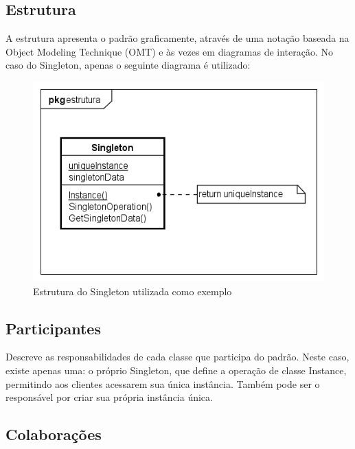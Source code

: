 \subsection*{Estrutura}

A estrutura apresenta o padrão graficamente, através de uma 
notação baseada na Object Modeling Technique (OMT) e às vezes 
em diagramas de interação. No caso do Singleton, apenas o 
seguinte diagrama é utilizado:

\begin{figure}[htb]
	\caption{\label{fig_grafico}Estrutura do Singleton utilizada como exemplo}
	\begin{center}
	    \includegraphics[scale=0.6]{5_padroes-contexto-funcional/5.1_criacionais/5.1.5_singleton/singleton_estrutura.png}
    \end{center}
\end{figure}

\subsection*{Participantes}

Descreve as responsabilidades de cada classe que 
participa do padrão. Neste caso, existe 
apenas uma: o próprio Singleton, que define 
a operação de classe Instance, permitindo aos clientes 
acessarem sua única instância. Também pode ser o 
responsável por criar sua própria instância única.

\subsection*{Colaborações}

